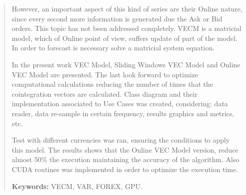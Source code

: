 \begin{quotation}
However, an important aspect of this kind of series are their Online nature,
since every second more information is generated due the Ask or Bid orders.
This topic has not been addressed completely. VECM is a matricial model, which
of Online point of view, suffers update of part of the model. In order
to forecast is necessary solve a matricial system equation.


In the present work VEC Model, Sliding Windows VEC Model and Online VEC Model
are presented. The last look forward to optimize computational calculations reducing
the number of times that the cointegration vectors are calculated. Class diagram
and their implementation associated to Use Cases was created, considering: data
reader, data re-sample in certain frequency, results graphics and metrics, etc.


Test with different currencies was ran, ensuring the conditions to apply this
model. The results shows that the Online VEC Model version, reduce almost 50\%
the execution maintaining the accuracy of the algorithm. Also CUDA routines was
implemented in order to optimize the execution time.


{\bf Keywords:} VECM, VAR, FOREX, GPU.
\end{quotation}

